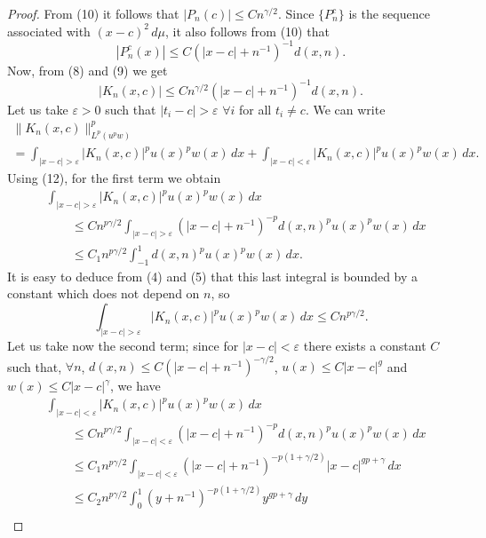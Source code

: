 \documentclass[a4paper,12pt]{article}
\theoremstyle{plain}
\theoremstyle{definition}
\begin{document}
\begin{proof}
From (10) it follows that $| P_{n}(c) | \leq C n^{\gamma/2}$.
Since $\{P_{n}^{c}\}$ is the sequence
associated with $(x-c)^{2}\,d\mu$, it also follows from (10)
that
$$
| P_{n}^{c}(x) | \leq C ( | x - c | + n^{-1})^{-1} d(x,n).
$$
Now, from (8) and (9) we get
\begin{equation}
| K_{n}(x,c) | \leq C n^{\gamma/2} ( | x - c | + n^{-1})^{-1} d(x,n).
\tag{12}
\end{equation}
Let us take $\varepsilon > 0$ such that $| t_{i} - c | > \varepsilon$
$\forall i$ for all $t_{i} \neq c$.
We can write
\begin{multline*}
\| K_{n}(x,c) \|^{p}_{L^{p}(u^{p}w)} \\
= \int_{| x - c | > \varepsilon} | K_{n}(x,c) |^{p} u(x)^{p} w(x)\,dx
+ \int_{| x - c | < \varepsilon} | K_{n}(x,c) |^{p} u(x)^{p} w(x)\,dx.
\end{multline*}
Using (12), for the first term we obtain
\begin{align*}
&\int_{| x - c | > \varepsilon} | K_{n}(x,c) |^{p} u(x)^{p} w(x)\,dx \\
&\qquad\leq C n^{p \gamma/2} \int_{| x - c | > \varepsilon}
( | x - c | + n^{-1})^{-p} d(x,n)^{p} u(x)^{p} w(x)\,dx \\
&\qquad\leq C_{1} n^{p \gamma/2} \int_{-1}^{1} d(x,n)^{p} u(x)^{p} w(x)\,dx.
\end{align*}
It is easy to deduce from (4) and (5) that this last integral
is bounded by a constant which does not depend on $n$, so
\begin{equation}
\int_{| x - c | > \varepsilon} | K_{n}(x,c) |^{p} u(x)^{p} w(x)\,dx
\leq C n^{p\gamma/2}.
\tag{13}
\end{equation}
Let us take now the second term; since for $| x - c | < \varepsilon$
there exists a constant $C$ such that, $\forall n$,
$d(x,n) \leq C ( | x - c | + n^{-1})^{-\gamma/2}$,
$u(x) \leq C | x - c |^{g}$
and $w(x) \leq C | x - c |^{\gamma}$, we have
\begin{align*}
&\int_{| x - c | < \varepsilon} | K_{n}(x,c) |^{p} u(x)^{p} w(x)\,dx \\
&\qquad\leq C n^{p\gamma/2} \int_{| x - c | < \varepsilon} ( | x - c | + n^{-1})^{-p}
d(x,n)^{p} u(x)^{p} w(x)\,dx \\
&\qquad\leq C_{1} n^{p \gamma/2}
\int_{| x - c | < \varepsilon} ( | x - c | + n^{-1})^{-p(1+\gamma/2)}
| x - c |^{gp+\gamma} \,dx \\
&\qquad\leq C _{2} n^{p\gamma/2}
\int_{0}^{1} (y + n^{-1})^{-p(1+\gamma/2)} y^{gp+\gamma} \,dy \\

\end{align*}
\end{proof}
\end{document}
